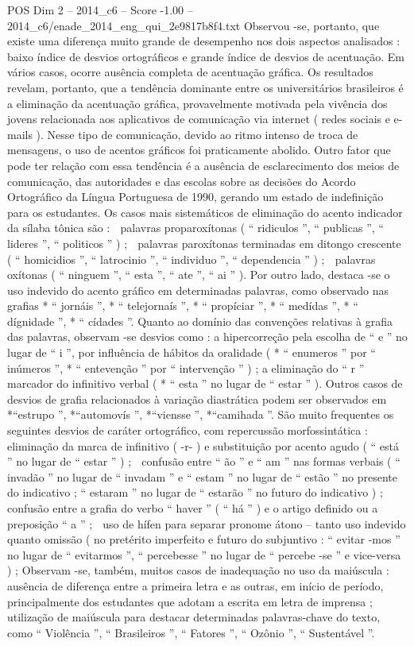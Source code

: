 \begin{textsample}{POS Dim 2 – 2014\_c6 – Score -1.00 – 2014\_c6/enade\_2014\_eng\_qui\_2e9817b8f4.txt}
Observou -se, portanto, que existe uma diferença muito grande de desempenho nos dois aspectos analisados : baixo índice de desvios ortográficos e grande índice de desvios de acentuação.
Em vários casos, ocorre ausência completa de acentuação gráfica.
Os resultados revelam, portanto, que a tendência dominante entre os universitários brasileiros é a eliminação da acentuação gráfica, provavelmente motivada pela vivência dos jovens relacionada aos aplicativos de comunicação via internet ( redes sociais e e-mails ).
Nesse tipo de comunicação, devido ao ritmo intenso de troca de mensagens, o uso de acentos gráficos foi praticamente abolido.
Outro fator que pode ter relação com essa tendência é a ausência de esclarecimento dos meios de comunicação, das autoridades e das escolas sobre as decisões do Acordo Ortográfico da Língua Portuguesa de 1990, gerando um estado de indefinição para os estudantes.
Os casos mais sistemáticos de eliminação do acento indicador da sílaba tônica são :  palavras proparoxítonas ( “ ridiculos ”, “ publicas ”, “ lideres ”, “ politicos ” ) ;  palavras paroxítonas terminadas em ditongo crescente ( “ homicidios ”, “ latrocinio ”, “ individuo ”, “ dependencia ” ) ;  palavras oxítonas ( “ ninguem ”, “ esta ”, “ ate ”, “ ai ” ).
Por outro lado, destaca -se o uso indevido do acento gráfico em determinadas palavras, como observado nas grafias * “ jornáis ”, * “ telejornaís ”, * “ propíciar ”, * “ medídas ”, * “ dígnidade ”, * “ cídades ”.
Quanto ao domínio das convenções relativas à grafia das palavras, observam -se desvios como : a hipercorreção pela escolha de “ e ” no lugar de “ i ”, por influência de hábitos da oralidade ( * “ enumeros ” por “ inúmeros ”, * “ entevenção ” por “ intervenção ” ) ; a eliminação do “ r ” marcador do infinitivo verbal ( * “ esta ” no lugar de “ estar ” ).
Outros casos de desvios de grafia relacionados à variação diastrática podem ser observados em *“estrupo ”, *“automovís ”, *“viensse ”, *“camihada ”.
São muito frequentes os seguintes desvios de caráter ortográfico, com repercussão morfossintática :  eliminação da marca de infinitivo ( -r- ) e substituição por acento agudo ( “ está ” no lugar de “ estar ” ) ;  confusão entre “ ão ” e “ am ” nas formas verbais ( “ invadão ” no lugar de “ invadam ” e “ estam ” no lugar de “ estão ” no presente do indicativo ; “ estaram ” no lugar de “ estarão ” no futuro do indicativo ) ;  confusão entre a grafia do verbo “ haver ” ( “ há ” ) e o artigo definido ou a preposição “ a ” ;  uso de hífen para separar pronome átono – tanto uso indevido quanto omissão ( no pretérito imperfeito e futuro do subjuntivo : “ evitar -mos ” no lugar de “ evitarmos ”, “ percebesse ” no lugar de “ percebe -se ” e vice-versa ) ; Observam -se, também, muitos casos de inadequação no uso da maiúscula : ausência de diferença entre a primeira letra e as outras, em início de período, principalmente dos estudantes que adotam a escrita em letra de imprensa ; utilização de maiúscula para destacar determinadas palavras-chave do texto, como “ Violência ”, “ Brasileiros ”, “ Fatores ”, “ Ozônio ”, “ Sustentável ”.

\end{textsample}
